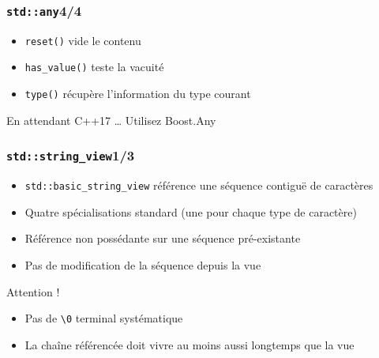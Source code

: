 \documentclass[C++.tex]{subfiles}
\begin{document}
\begin{frame}[fragile]
	\frametitle{\lstinline|std::any|\titlehfill{}4/4}
	\begin{itemize}
		\item \lstinline|reset()| vide le contenu
		\item \lstinline|has_value()| teste la vacuité
		\item \lstinline|type()| récupère l'information du type courant


	\end{itemize}

	\begin{block}{En attendant C++17 \ldots}
		Utilisez Boost.Any
	\end{block}
\end{frame}

\begin{frame}[fragile]
	\frametitle{\lstinline|std::string_view|\titlehfill{}1/3}
	\begin{itemize}
		\item \lstinline|std::basic_string_view| référence une séquence contiguë de caractères
		\item Quatre spécialisations standard (une pour chaque type de caractère)


		\item Référence non possédante sur une séquence pré-existante
		\item Pas de modification de la séquence depuis la vue
	\end{itemize}

	\begin{alertblock}{Attention !}
		\begin{itemize}
			\item Pas de \lstinline|\0| terminal systématique
			\item La chaîne référencée doit vivre au moins aussi longtemps que la vue
		\end{itemize}
	\end{alertblock}
\end{frame}
\end{document}
